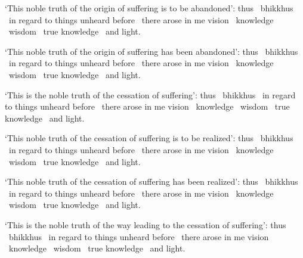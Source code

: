 \medskip

\begin{english-hang}
  `This noble truth of the origin of suffering is to be abandoned': thus \breathmark\ bhikkhus \breathmark\ in regard to things unheard before \breathmark\ there arose in me vision \breathmark\ knowledge \breathmark\ wisdom \breathmark\ true knowledge \breathmark\ and light.
\end{english-hang}

\medskip

\begin{english-hang}
  `This noble truth of the origin of suffering has been abandoned': thus \breathmark\ bhikkhus \breathmark\ in regard to things unheard before \breathmark\ there arose in me vision \breathmark\ knowledge \breathmark\ wisdom \breathmark\ true knowledge \breathmark\ and light.
\end{english-hang}

\medskip

\begin{english-hang}
  `This is the noble truth of the cessation of suffering': thus \breathmark\ bhikkhus \breathmark\ in regard to things unheard before \breathmark\ there arose in me vision \breathmark\ knowledge \breathmark\ wisdom \breathmark\ true knowledge \breathmark\ and light.
\end{english-hang}

\medskip

\begin{english-hang}
  `This noble truth of the cessation of suffering is to be realized': thus \breathmark\ bhikkhus \breathmark\ in regard to things unheard before \breathmark\ there arose in me vision \breathmark\ knowledge \breathmark\ wisdom \breathmark\ true knowledge \breathmark\ and light.
\end{english-hang}

\medskip

\begin{english-hang}
  `This noble truth of the cessation of suffering has been realized': thus \breathmark\ bhikkhus \breathmark\ in regard to things unheard before \breathmark\ there arose in me vision \breathmark\ knowledge \breathmark\ wisdom \breathmark\ true knowledge \breathmark\ and light.
\end{english-hang}

\medskip

\begin{english-hang}
  `This is the noble truth of the way leading to the cessation of suffering': thus \breathmark\ bhikkhus \breathmark\ in regard to things unheard before \breathmark\ there arose in me vision \breathmark\ knowledge \breathmark\ wisdom \breathmark\ true knowledge \breathmark\ and light.
\end{english-hang}

